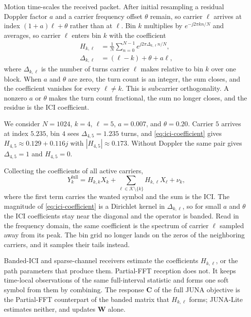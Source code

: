 \documentclass[conference]{IEEEtran}
\newcommand{\Kset}{\mathcal{K}}
\begin{document}
Motion time-scales the received packet.  After initial resampling a residual
Doppler factor \(a\) and a carrier frequency offset \(\theta\) remain, so carrier
\(\ell\) arrives at index \((1+a)\ell+\theta\) rather than at \(\ell\).  Bin
\(k\) multiplies by \(e^{-j2\pi kn/N}\) and averages, so carrier \(\ell\)
enters bin \(k\) with the coefficient
\begin{align}
  H_{k,\ell}
  &=
  \frac{1}{N}\sum_{n=0}^{N-1}
  e^{j2\pi\Delta_{k,\ell}n/N},
  \label{eq:ici-coefficient}\\
  \Delta_{k,\ell}
  &=
  (\ell-k)+\theta+a\ell,
  \label{eq:leftover-turns}
\end{align}
where \(\Delta_{k,\ell}\) is the number of turns carrier \(\ell\) makes
relative to bin \(k\) over one block.  When \(a\) and \(\theta\) are zero, the
turn count is an integer, the sum closes, and the coefficient vanishes for
every \(\ell\neq k\).  This is subcarrier orthogonality.  A nonzero \(a\) or
\(\theta\) makes the turn count fractional, the sum no longer closes, and the
residue is the ICI coefficient.

We consider \(N=1024\), \(k=4\), \(\ell=5\), \(a=0.007\), and \(\theta=0.20\).
Carrier \(5\) arrives at index \(5.235\), bin \(4\) sees
\(\Delta_{4,5}=1.235\) turns, and \eqref{eq:ici-coefficient} gives
\(H_{4,5}\approx0.129+0.116j\) with \(|H_{4,5}|\approx0.173\).  Without
Doppler the same pair gives \(\Delta_{4,5}=1\) and \(H_{4,5}=0\).

Collecting the coefficients of all active carriers,
\begin{equation}
  Y_k^{\mathrm{full}}
  =
  H_{k,k}X_k
  +
  \sum_{\ell\in\Kset\setminus\{k\}}
  H_{k,\ell}X_\ell
  +
  \nu_k,
  \label{eq:ici-row}
\end{equation}
where the first term carries the wanted symbol and the sum is the ICI.  The
magnitude of \eqref{eq:ici-coefficient} is a Dirichlet kernel in
\(\Delta_{k,\ell}\), so for small \(a\) and \(\theta\) the ICI coefficients stay
near the diagonal and the operator is banded.  Read in the frequency domain, the
same coefficient is the spectrum of carrier \(\ell\) sampled away from its
peak.  The bin grid no longer lands on the zeros of the neighboring carriers,
and it samples their tails instead.

Banded-ICI and sparse-channel receivers estimate the coefficients
\(H_{k,\ell}\), or the path parameters that produce them.  Partial-FFT
reception does not.  It keeps time-local observations of the same
full-interval statistic and forms one soft symbol from them by combining.
The response \(\mathbf C\) of the full JUNA objective is the Partial-FFT
counterpart of the banded matrix that \(H_{k,\ell}\) forms; JUNA-Lite
estimates neither, and updates \(\mathbf W\) alone.
\end{document}
